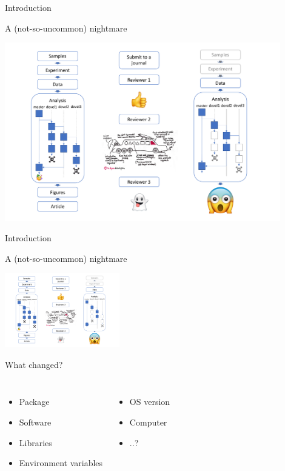 \begin{frame}{Introduction}

\begin{center}
A (not-so-uncommon) nightmare

\includegraphics[width=12cm]{02_encapsulation/figures/nightmare_v2-3.pdf}

\end{center}

\end{frame}

\begin{frame}{Introduction}

\begin{center}
A (not-so-uncommon) nightmare

\includegraphics[width=5cm]{02_encapsulation/figures/nightmare_v2-3.pdf}

What changed?
\end{center}

\begin{columns}

\begin{itemize}
  \item Package
  \item Software
  \item Libraries
  \item Environment variables
\end{itemize}


\begin{itemize}
  \item OS version
  \item Computer
  \item ..?
\end{itemize}

\end{columns}


\end{frame}


